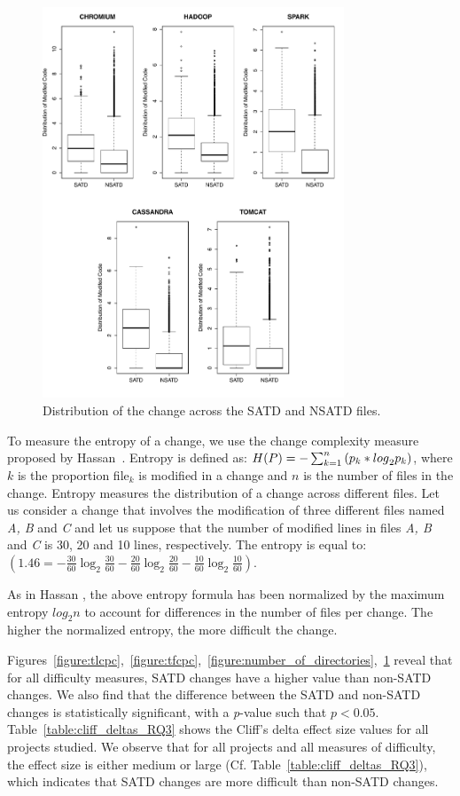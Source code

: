 \begin{figure}[tb]
	\centering
	\includegraphics[width=90mm]{figures/chapter3/entropy_for_all_projects}
	\caption{Distribution of the change across the SATD and NSATD files.}
	\label{figure:mtdocatdf}
\end{figure}


To measure the entropy of a change, we use the change complexity measure proposed by Hassan~\cite{hassan2009predicting}. Entropy is defined as: $H(P)=-\sum _{k=1}^{n}\textrm ({p}_{k}*{log}_{2} {p}_{k})$, where $k$ is the proportion file$_{k}$ is modified in a change and $n$ is the number of files in the change. Entropy measures the distribution of a change across different files. Let us consider a change that involves the modification of three different files named \textit{A, B} and \textit{C} and let us suppose that the number of modified lines in files\textit{ A, B} and \textit{C} is 30, 20 and 10 lines, respectively. The entropy is equal to:
$(1.46=-\frac{30}{60}\log_{2}\frac{30}{60}-\frac{20}{60}\log_{2}\frac{20}{60}-\frac{10}{60}\log_{2}\frac{10}{60})$.

As in Hassan \cite{hassan2009predicting}, the above entropy formula has been normalized by the maximum entropy $log_{2}n$ to account for differences in the number of files per change. The higher the normalized entropy, the more difficult the change.




 Figures~\ref{figure:tlcpc},~\ref{figure:tfcpc},~\ref{figure:number_of_directories},~\ref{figure:mtdocatdf} reveal that for all difficulty measures, SATD changes have a higher value than non-SATD changes. We also find that the difference between the SATD and non-SATD changes is statistically significant, with a \textit{p}-value such that $p < 0.05$. Table~\ref{table:cliff_deltas_RQ3} shows the Cliff's delta effect size values for all projects studied. We observe that for all projects and all measures of difficulty, the effect size is either medium or large (Cf. Table~\ref{table:cliff_deltas_RQ3}), which indicates that SATD changes are more difficult than non-SATD changes.

